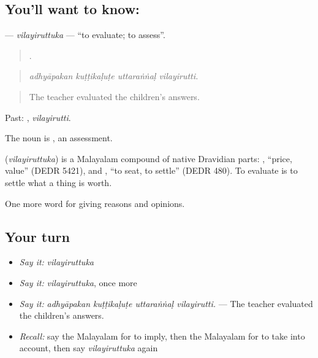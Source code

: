\subsection*{You'll want to know: }
\textbf{} — \emph{vilayiruttuka} — \textquotedblleft{}to evaluate; to assess\textquotedblright{}.

\begin{quote}
   .
\end{quote}

\begin{quote}
\emph{adhyāpakan kuṭṭikaḷuṭe uttaraṅṅaḷ vilayirutti.}
\end{quote}

\begin{quote}
The teacher evaluated the children's answers.
\end{quote}

Past: , \emph{vilayirutti}.

The noun is , an assessment.

\begin{cousinweb}
\textbf{} (\emph{vilayiruttuka}) is a Malayalam compound of native Dravidian parts: , \textquotedblleft{}price, value\textquotedblright{} (DEDR 5421), and , \textquotedblleft{}to seat, to settle\textquotedblright{} (DEDR 480). To evaluate is to settle what a thing is worth.
\end{cousinweb}

\begin{grammarlens}[title={What you've built}]
One more word for giving reasons and opinions.
\end{grammarlens}

\subsection*{Your turn}
\begin{itemize}
\raggedright
  \item \emph{Say it:} \emph{vilayiruttuka}
  \item \emph{Say it:} \emph{vilayiruttuka}, once more
  \item \emph{Say it:} \emph{adhyāpakan kuṭṭikaḷuṭe uttaraṅṅaḷ vilayirutti.} — The teacher evaluated the children's answers.
  \item \emph{Recall:} say the Malayalam for to imply, then the Malayalam for to take into account, then say \emph{vilayiruttuka} again
\end{itemize}

